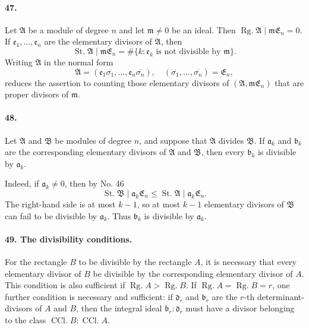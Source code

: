 \documentclass[11pt]{article}
\newcommand{\Rg}{\operatorname{Rg.}}
\newcommand{\Kkl}{\operatorname{CCl.}}
\newcommand{\St}{\operatorname{St.}}
\begin{document}
\paragraph{47.}
Let $\mathfrak A$ be a module of degree $n$ and let $\mathfrak m\ne0$ be an ideal. Then $\Rg\mathfrak A\mid\mathfrak m\mathfrak E_n=0$. If $\mathfrak e_1,
\ldots,
\mathfrak e_n$ are the elementary divisors of $\mathfrak A$, then
\[
\St\mathfrak A\mid\mathfrak m\mathfrak E_n
=
\#\{k:\mathfrak e_k\text{ is not divisible by }\mathfrak m\}.
\]
Writing $\mathfrak A$ in the normal form
\[
\mathfrak A=(\mathfrak e_1\overline{\sigma_1},
\ldots,
\mathfrak e_n\overline{\sigma_n}),
\quad
(\overline{\sigma_1},
\ldots,
\overline{\sigma_n})=\mathfrak E_n,
\]
reduces the assertion to counting those elementary divisors of $(\mathfrak A,
\mathfrak m\mathfrak E_n)$ that are proper divisors of $\mathfrak m$.

\paragraph{48.}
Let $\mathfrak A$ and $\mathfrak B$ be modules of degree $n$, and suppose that $\mathfrak A$ divides $\mathfrak B$. If $\mathfrak a_k$ and $\mathfrak b_k$ are the corresponding elementary divisors of $\mathfrak A$ and $\mathfrak B$, then every $\mathfrak b_k$ is divisible by $\mathfrak a_k$.

Indeed, if $\mathfrak a_k\ne0$, then by No. 46
\begin{equation}
\St\mathfrak B\mid\mathfrak a_k\mathfrak E_n
\le
\St\mathfrak A\mid\mathfrak a_k\mathfrak E_n.
\tag{81}
\end{equation}
The right-hand side is at most $k-1$, so at most $k-1$ elementary divisors of $\mathfrak B$ can fail to be divisible by $\mathfrak a_k$. Thus $\mathfrak b_k$ is divisible by $\mathfrak a_k$.

\paragraph{49. The divisibility conditions.}
For the rectangle $B$ to be divisible by the rectangle $A$, it is necessary that every elementary divisor of $B$ be divisible by the corresponding elementary divisor of $A$. This condition is also sufficient if $\Rg A>\Rg B$. If $\Rg A=\Rg B=r$, one further condition is necessary and sufficient: if $\mathfrak d_r$ and $\mathfrak b_r$ are the $r$-th determinant-divisors of $A$ and $B$, then the integral ideal $\mathfrak b_r:\mathfrak d_r$ must have a divisor belonging to the class $\Kkl B:\Kkl A$.
\end{document}
